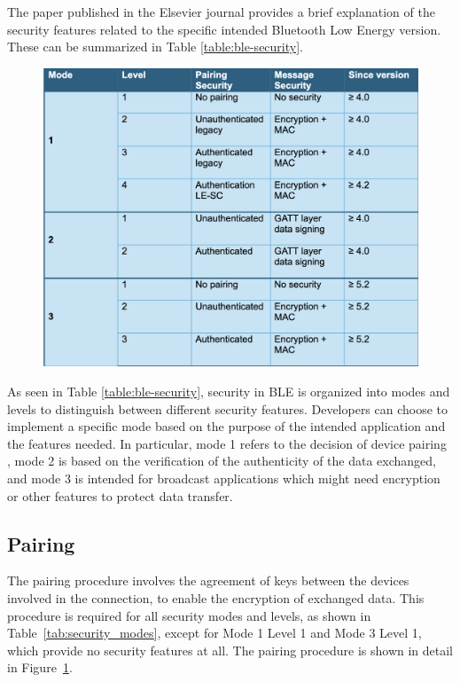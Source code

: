 \documentclass{Configuration_Files/PoliMi3i_thesis}
\begin{document}
The paper published in the Elsevier journal \cite{caesar2022survey} provides a brief explanation of the security features related to the specific intended Bluetooth Low Energy version. These can be summarized in Table \ref{table:ble-security}.

\begin{figure}[H]
    \centering
    \includegraphics[scale=0.7]{Bluetooth_Security/1.png}
    \label{fig:pairing_procedure}
\end{figure}

As seen in Table \ref{table:ble-security}, security in BLE is organized into modes and levels to distinguish between different security features. Developers can choose to implement a specific mode based on the purpose of the intended application and the features needed. In particular, mode 1 refers to the decision of device pairing \cite{circuits2021}, mode 2 is based on the verification of the authenticity of the data exchanged, and mode 3 is intended for broadcast applications which might need encryption or other features to protect data transfer.

\subsection{Pairing}

The pairing procedure involves the agreement of keys between the devices involved in the connection, to enable the encryption of exchanged data. This procedure is required for all security modes and levels, as shown in Table~\ref{tab:security_modes}, except for Mode 1 Level 1 and Mode 3 Level 1, which provide no security features at all. The pairing procedure is shown in detail in Figure~\ref{fig:pairing_procedure}.
\end{document}
